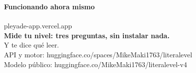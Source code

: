 \documentclass[aspectratio=169,11pt]{beamer}
\begin{document}
\begin{frame}[plain]
\vspace{6mm}
\begin{center}
{\Large\bfseries\color{llazul} Funcionando ahora mismo}\\[5mm]

\\[3mm]

{\large\ttfamily pleyade-app.vercel.app}\\[4mm]

{\normalsize\bfseries Mide tu nivel: tres preguntas, sin instalar nada.}\\[1pt]
{\normalsize Y te dice qué leer.}\\[6mm]

{\small\color{llgris} API y motor:
\ttfamily huggingface.co/spaces/MikeMaki1763/literalevel}\\[2mm]
{\small\color{llgris} Modelo público:
\ttfamily huggingface.co/MikeMaki1763/literalevel-v4}
\end{center}
\end{frame}
\end{document}
